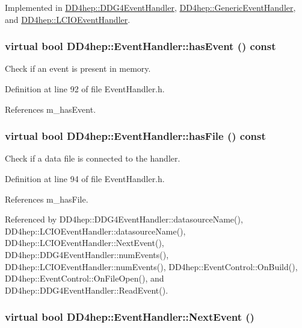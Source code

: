 Implemented in \hyperlink{class_d_d4hep_1_1_d_d_g4_event_handler_a3af4cf3191fabf450e81812e93d2502a}{DD4hep::DDG4EventHandler}, \hyperlink{class_d_d4hep_1_1_generic_event_handler_a7a7c4d1592e5b2d467a426058aa1a44b}{DD4hep::GenericEventHandler}, and \hyperlink{class_d_d4hep_1_1_l_c_i_o_event_handler_af7089e4660ace0f0a4da544bb39660e5}{DD4hep::LCIOEventHandler}.\hypertarget{class_d_d4hep_1_1_event_handler_a43ded5dfb592a8119aee05f07ca7a95b}{
\subsubsection[{hasEvent}]{\setlength{\rightskip}{0pt plus 5cm}virtual bool DD4hep::EventHandler::hasEvent () const}}
\label{class_d_d4hep_1_1_event_handler_a43ded5dfb592a8119aee05f07ca7a95b}


Check if an event is present in memory. 

Definition at line 92 of file EventHandler.h.

References m\_\-hasEvent.\hypertarget{class_d_d4hep_1_1_event_handler_ab1c6611119a3c90bd83bb3bc41159498}{
\subsubsection[{hasFile}]{\setlength{\rightskip}{0pt plus 5cm}virtual bool DD4hep::EventHandler::hasFile () const}}
\label{class_d_d4hep_1_1_event_handler_ab1c6611119a3c90bd83bb3bc41159498}


Check if a data file is connected to the handler. 

Definition at line 94 of file EventHandler.h.

References m\_\-hasFile.

Referenced by DD4hep::DDG4EventHandler::datasourceName(), DD4hep::LCIOEventHandler::datasourceName(), DD4hep::LCIOEventHandler::NextEvent(), DD4hep::DDG4EventHandler::numEvents(), DD4hep::LCIOEventHandler::numEvents(), DD4hep::EventControl::OnBuild(), DD4hep::EventControl::OnFileOpen(), and DD4hep::DDG4EventHandler::ReadEvent().\hypertarget{class_d_d4hep_1_1_event_handler_ac2360791d3a44f4cef0987f9a7ec51ce}{
\subsubsection[{NextEvent}]{\setlength{\rightskip}{0pt plus 5cm}virtual bool DD4hep::EventHandler::NextEvent ()}}
\label{class_d_d4hep_1_1_event_handler_ac2360791d3a44f4cef0987f9a7ec51ce}


